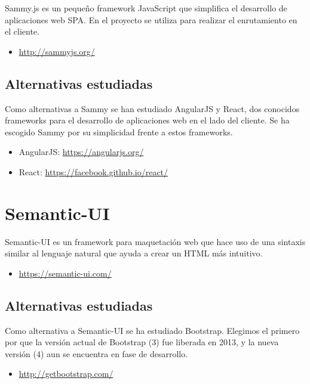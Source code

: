 Sammy.js es un pequeño framework JavaScript que simplifica el desarrollo de aplicaciones web SPA.
En el proyecto se utiliza para realizar el enrutamiento en el cliente.

\begin{itemize}
	\item \url{http://sammyjs.org/}
\end{itemize}

\subsection{Alternativas estudiadas}

Como alternativas a Sammy se han estudiado AngularJS y React, dos conocidos frameworks para el desarrollo de aplicaciones web en el lado del cliente. Se ha escogido Sammy por su simplicidad frente a estos frameworks.

\begin{itemize}
	\item AngularJS: \url{https://angularjs.org/}
	\item React: \url{https://facebook.github.io/react/}
\end{itemize}

\section{Semantic-UI}

Semantic-UI es un framework para maquetación web que hace uso de una sintaxis similar al lenguaje natural que ayuda a crear un HTML más intuitivo.

\begin{itemize}
	\item \url{https://semantic-ui.com/}
\end{itemize}

\subsection{Alternativas estudiadas}

Como alternativa a Semantic-UI se ha estudiado Bootstrap. Elegimos el primero por que la versión actual de Bootstrap (3) fue liberada en 2013, y la nueva versión (4) aun se encuentra en fase de desarrollo.

\begin{itemize}
	\item \url{http://getbootstrap.com/}
\end{itemize}

